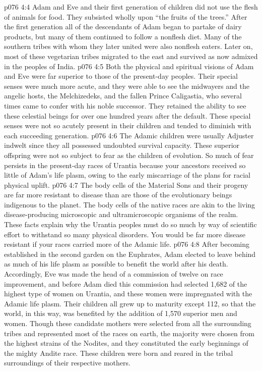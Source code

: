 \vs p076 4:4 Adam and Eve and their first generation of children did not use the flesh of animals for food. They subsisted wholly upon “the fruits of the trees.” After the first generation all of the descendants of Adam began to partake of dairy products, but many of them continued to follow a nonflesh diet. Many of the southern tribes with whom they later united were also nonflesh eaters. Later on, most of these vegetarian tribes migrated to the east and survived as now admixed in the peoples of India.
\vs p076 4:5 Both the physical and spiritual visions of Adam and Eve were far superior to those of the present\hyp{}day peoples. Their special senses were much more acute, and they were able to see the midwayers and the angelic hosts, the Melchizedeks, and the fallen Prince Caligastia, who several times came to confer with his noble successor. They retained the ability to see these celestial beings for over one hundred years after the default. These special senses were not so acutely present in their children and tended to diminish with each succeeding generation.
\vs p076 4:6 The Adamic children were usually Adjuster indwelt since they all possessed undoubted survival capacity. These superior offspring were not so subject to fear as the children of evolution. So much of fear persists in the present\hyp{}day races of Urantia because your ancestors received so little of Adam’s life plasm, owing to the early miscarriage of the plans for racial physical uplift.
\vs p076 4:7 The body cells of the Material Sons and their progeny are far more resistant to disease than are those of the evolutionary beings indigenous to the planet. The body cells of the native races are akin to the living disease\hyp{}producing microscopic and ultramicroscopic organisms of the realm. These facts explain why the Urantia peoples must do so much by way of scientific effort to withstand so many physical disorders. You would be far more disease resistant if your races carried more of the Adamic life.
\vs p076 4:8 \pc After becoming established in the second garden on the Euphrates, Adam elected to leave behind as much of his life plasm as possible to benefit the world after his death. Accordingly, Eve was made the head of a commission of twelve on race improvement, and before Adam died this commission had selected 1,682 of the highest type of women on Urantia, and these women were impregnated with the Adamic life plasm. Their children all grew up to maturity except 112, so that the world, in this way, was benefited by the addition of 1,570 superior men and women. Though these candidate mothers were selected from all the surrounding tribes and represented most of the races on earth, the majority were chosen from the highest strains of the Nodites, and they constituted the early beginnings of the mighty Andite race. These children were born and reared in the tribal surroundings of their respective mothers.
